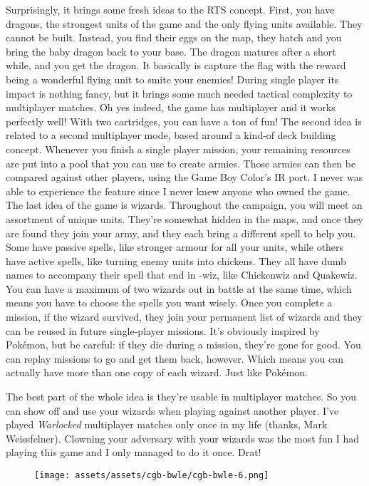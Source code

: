 \documentclass{book}
\begin{document}
Surprisingly, it brings some fresh ideas to the RTS concept. First, you have dragons, the strongest units of the game and the only flying units available. They cannot be built. Instead, you find their eggs on the map, they hatch and you bring the baby dragon back to your base. The dragon matures after a short while, and you get the dragon. It basically is capture the flag with the reward being a wonderful flying unit to smite your enemies! During single player its impact is nothing fancy, but it brings some much needed tactical complexity to multiplayer matches. Oh yes indeed, the game has multiplayer and it works perfectly well! With two cartridges, you can have a ton of fun! The second idea is related to a second multiplayer mode, based around a kind-of deck building concept. Whenever you finish a single player mission, your remaining resources are put into a pool that you can use to create armies. Those armies can then be compared against other players, using the Game Boy Color’s IR port. I never was able to experience the feature since I never knew anyone who owned the game. The last idea of the game is wizards. Throughout the campaign, you will meet an assortment of unique units. They’re somewhat hidden in the maps, and once they are found they join your army, and they each bring a different spell to help you. Some have passive spells, like stronger armour for all your units, while others have active spells, like turning enemy units into chickens. They all have dumb names to accompany their spell that end in -wiz, like Chickenwiz and Quakewiz. You can have a maximum of two wizards out in battle at the same time, which means you have to choose the spells you want wisely. Once you complete a mission, if the wizard survived, they join your permanent list of wizards and they can be reused in future single-player missions. It’s obviously inspired by Pokémon, but be careful: if they die during a mission, they’re gone for good. You can replay missions to go and get them back, however. Which means you can actually have more than one copy of each wizard. Just like Pokémon.

The best part of the whole idea is they’re usable in multiplayer matches. So you can show off and use your wizards when playing against another player. I’ve played \emph{Warlocked} multiplayer matches only once in my life (thanks, Mark Weissfelner). Clowning your adversary with your wizards was the most fun I had playing this game and I only managed to do it once. Drat!

\begin{figure}[hbt]
\vskip 10pt
\centering \texttt{[image: assets/assets/cgb-bwle/cgb-bwle-6.png]}
\vskip 6pt
\end{figure}
\end{document}
